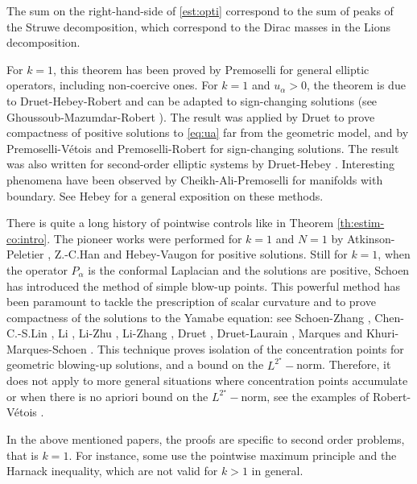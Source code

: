 \documentclass[reqno]{amsart}
\def \crit {2^\star}
\def \ua {u_\alpha}
\begin{document}
The sum on the right-hand-side of \eqref{est:opti} correspond to the sum of peaks of the Struwe decomposition, which correspond to the Dirac masses in the Lions decomposition.

\smallskip\noindent For $k=1$, this theorem has been proved by Premoselli \cite{premoselli} for general elliptic operators, including non-coercive ones. For $k=1$ and $\ua>0$, the theorem is due to Druet-Hebey-Robert \cite{DHR} and can be adapted to sign-changing solutions (see Ghoussoub-Mazumdar-Robert \cites{gmr:memams,gmr:jde}). The result  was applied by Druet \cite{druet:jdg} to prove compactness of positive solutions to \eqref{eq:ua} far from the geometric model, and by Premoselli-V\'etois \cites{premo-vetois-jmpa,premo-vetois-aim,premo-vetois-eigen} and Premoselli-Robert \cite{PR} for sign-changing solutions. The result was also written for second-order elliptic systems by Druet-Hebey \cite{DH}. Interesting phenomena have been observed by Cheikh-Ali-Premoselli \cite{CA-P} for manifolds with boundary. See Hebey \cite{hebey.eth} for a general exposition on these methods.

\smallskip\noindent There is quite a long history of pointwise controls like in Theorem \ref{th:estim-co:intro}. The pioneer works were performed for $k=1$ and $N=1$ by Atkinson-Peletier \cite{AP}, Z.-C.Han \cite{zchan} and Hebey-Vaugon \cite{HV} for positive solutions. Still for $k=1$, when the operator $P_\alpha$ is the conformal Laplacian and the solutions are positive, Schoen \cites{schoen-montecatini,schoen1988} has introduced the method of simple blow-up points. This powerful method has been paramount to tackle the prescription of scalar curvature and to prove compactness of the solutions to the Yamabe equation: see Schoen-Zhang \cite{sz}, Chen-C.-S.Lin \cites{cs:lin:1,cs:lin:2,cs:lin:3}, Li \cites{li-95,li-96}, Li-Zhu \cite{LiZhu}, Li-Zhang \cites{LiZha3,LiZhang2005}, Druet \cite{druet:imrn}, Druet-Laurain \cite{druet:laurain}, Marques \cite{Mar} and Khuri-Marques-Schoen \cite{kms}. This technique proves isolation of the concentration points for geometric blowing-up solutions, and a bound on the $L^{\crit}-$norm. Therefore, it does not apply to more general situations where concentration points accumulate or when there is no apriori bound on the $L^{\crit}-$norm, see the examples of Robert-V\'etois \cite{RV:jdg}. 

\smallskip\noindent In the above mentioned papers, the proofs are specific to second order problems, that is $k=1$. For instance, some use the pointwise maximum principle and the Harnack inequality, which are not valid for $k>1$ in general.
\end{document}
